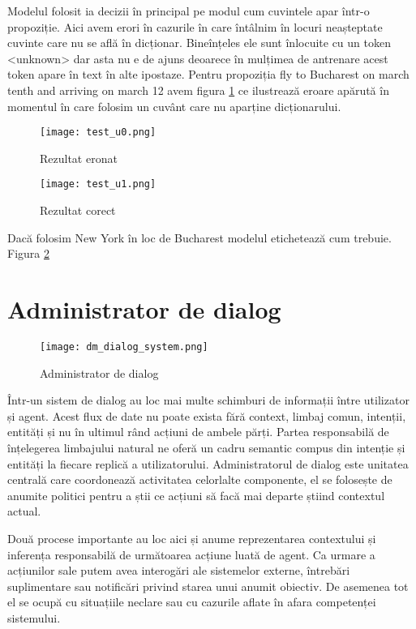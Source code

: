Modelul folosit ia decizii în principal pe modul cum cuvintele apar într-o propoziție. Aici avem erori în cazurile în care întâlnim în locuri neașteptate cuvinte care nu se află în dicționar. Bineînțeles ele sunt înlocuite cu un token  <unknown> dar asta nu e de ajuns deoarece în mulțimea de antrenare acest token apare în text în alte ipostaze.
Pentru propoziția {\ttfamily fly to Bucharest on march tenth and arriving on march 12} avem figura \ref{fig:test_u0} ce ilustrează eroare apărută în momentul în care folosim un cuvânt care nu aparține dicționarului.
\begin{figure}[h]
	\centering
	\texttt{[image: test\_u0.png]}
	\caption{Rezultat eronat}
	\label{fig:test_u0}
\end{figure}

\begin{figure}[h]
	\centering
	\texttt{[image: test\_u1.png]}
	\caption{Rezultat corect}
	\label{fig:test_u1}
\end{figure}
Dacă folosim {\ttfamily New York} în loc de {\ttfamily Bucharest} modelul etichetează cum trebuie. Figura \ref{fig:test_u1}


\section{Administrator de dialog}
\begin{figure}[h]
	\centering
	\texttt{[image: dm\_dialog\_system.png]}
	\caption{Administrator de dialog}
	\label{fig:dm_ds_proc}
\end{figure}

Într-un sistem de dialog au loc mai multe schimburi de informații între utilizator și agent. Acest flux de date nu poate exista fără context, limbaj comun, intenții, entități și nu în ultimul rând acțiuni de ambele părți. Partea responsabilă de înțelegerea limbajului natural ne oferă un cadru semantic compus din intenție și entități la fiecare replică a utilizatorului. Administratorul de dialog este unitatea centrală care coordonează activitatea celorlalte componente, el se folosește de anumite politici pentru a știi ce acțiuni să facă mai departe știind contextul actual.

Două procese importante au loc aici și anume reprezentarea contextului și inferența responsabilă de următoarea acțiune luată de agent.
Ca urmare a acțiunilor sale putem avea interogări ale sistemelor externe, întrebări suplimentare sau notificări privind starea unui anumit obiectiv.
De asemenea tot el se ocupă cu situațiile neclare sau cu cazurile aflate în afara competenței sistemului.

